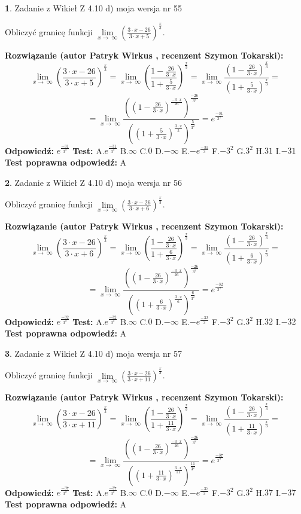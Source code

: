 \documentclass[12pt, a4paper]{article}
\theoremstyle{definition} %
\newtheorem{zad}{}
\newcommand{\zadStart}[1]{\begin{zad}#1\newline}
\newcommand{\zadStop}{\end{zad}}
\newcommand{\rozwStart}[2]{\noindent \textbf{Rozwiązanie (autor #1 , recenzent #2): }\newline}
\newcommand{\rozwStop}{\newline}
\newcommand{\odpStart}{\noindent \textbf{Odpowiedź:}\newline}
\newcommand{\odpStop}{\newline}
\newcommand{\testStart}{\noindent \textbf{Test:}\newline}
\newcommand{\testStop}{\newline}
\newcommand{\kluczStart}{\noindent \textbf{Test poprawna odpowiedź:}\newline}
\newcommand{\kluczStop}{\newline}
\begin{document}
\zadStart{Zadanie z Wikieł Z 4.10 d) moja wersja nr 55}


Obliczyć granicę funkcji  $\lim\limits_{x\to\ \infty}(\frac{3\cdot x-26}{3\cdot x+5})^{\frac{x}{3}}$.
\zadStop
\rozwStart{Patryk Wirkus}{Szymon Tokarski}
$$\lim\limits_{x\to\ \infty}(\frac{3\cdot x-26}{3\cdot x+5})^{\frac{x}{3}} = \lim\limits_{x\to\ \infty}(\frac{1-\frac{26}{3\cdot x}}{1+\frac{5}{3\cdot x}})^{\frac{x}{3}}=\lim\limits_{x\to\ \infty}\frac{(1-\frac{26}{3\cdot x})^{\frac{x}{3}}}{(1+\frac{5}{3\cdot x})^{\frac{x}{3}}}=$$
$$=\lim\limits_{x\to\ \infty}\frac{((1-\frac{26}{3\cdot x})^{\frac{-3\cdot x}{26}})^{\frac{-26}{3^{2}}}}{((1+\frac{5}{3\cdot x})^{\frac{3\cdot x}{5}})^{\frac{5}{3^{2}}}}=e^{\frac{-31}{3^{2}}}$$
\rozwStop
\odpStart
$e^{\frac{-31}{3^{2}}}$
\odpStop
\testStart
A.$e^{\frac{-31}{3^{2}}}$ B.$\infty$ C.$0$ D.$-\infty$ E.$-e^{\frac{-31}{3}}$
F.$-3^{2}$ G.$3^{2}$
H.$31$
I.$-31$
\testStop
\kluczStart
A
\kluczStop



\zadStart{Zadanie z Wikieł Z 4.10 d) moja wersja nr 56}


Obliczyć granicę funkcji  $\lim\limits_{x\to\ \infty}(\frac{3\cdot x-26}{3\cdot x+6})^{\frac{x}{3}}$.
\zadStop
\rozwStart{Patryk Wirkus}{Szymon Tokarski}
$$\lim\limits_{x\to\ \infty}(\frac{3\cdot x-26}{3\cdot x+6})^{\frac{x}{3}} = \lim\limits_{x\to\ \infty}(\frac{1-\frac{26}{3\cdot x}}{1+\frac{6}{3\cdot x}})^{\frac{x}{3}}=\lim\limits_{x\to\ \infty}\frac{(1-\frac{26}{3\cdot x})^{\frac{x}{3}}}{(1+\frac{6}{3\cdot x})^{\frac{x}{3}}}=$$
$$=\lim\limits_{x\to\ \infty}\frac{((1-\frac{26}{3\cdot x})^{\frac{-3\cdot x}{26}})^{\frac{-26}{3^{2}}}}{((1+\frac{6}{3\cdot x})^{\frac{3\cdot x}{6}})^{\frac{6}{3^{2}}}}=e^{\frac{-32}{3^{2}}}$$
\rozwStop
\odpStart
$e^{\frac{-32}{3^{2}}}$
\odpStop
\testStart
A.$e^{\frac{-32}{3^{2}}}$ B.$\infty$ C.$0$ D.$-\infty$ E.$-e^{\frac{-32}{3}}$
F.$-3^{2}$ G.$3^{2}$
H.$32$
I.$-32$
\testStop
\kluczStart
A
\kluczStop



\zadStart{Zadanie z Wikieł Z 4.10 d) moja wersja nr 57}


Obliczyć granicę funkcji  $\lim\limits_{x\to\ \infty}(\frac{3\cdot x-26}{3\cdot x+11})^{\frac{x}{3}}$.
\zadStop
\rozwStart{Patryk Wirkus}{Szymon Tokarski}
$$\lim\limits_{x\to\ \infty}(\frac{3\cdot x-26}{3\cdot x+11})^{\frac{x}{3}} = \lim\limits_{x\to\ \infty}(\frac{1-\frac{26}{3\cdot x}}{1+\frac{11}{3\cdot x}})^{\frac{x}{3}}=\lim\limits_{x\to\ \infty}\frac{(1-\frac{26}{3\cdot x})^{\frac{x}{3}}}{(1+\frac{11}{3\cdot x})^{\frac{x}{3}}}=$$
$$=\lim\limits_{x\to\ \infty}\frac{((1-\frac{26}{3\cdot x})^{\frac{-3\cdot x}{26}})^{\frac{-26}{3^{2}}}}{((1+\frac{11}{3\cdot x})^{\frac{3\cdot x}{11}})^{\frac{11}{3^{2}}}}=e^{\frac{-37}{3^{2}}}$$
\rozwStop
\odpStart
$e^{\frac{-37}{3^{2}}}$
\odpStop
\testStart
A.$e^{\frac{-37}{3^{2}}}$ B.$\infty$ C.$0$ D.$-\infty$ E.$-e^{\frac{-37}{3}}$
F.$-3^{2}$ G.$3^{2}$
H.$37$
I.$-37$
\testStop
\kluczStart
A
\kluczStop
\end{document}
